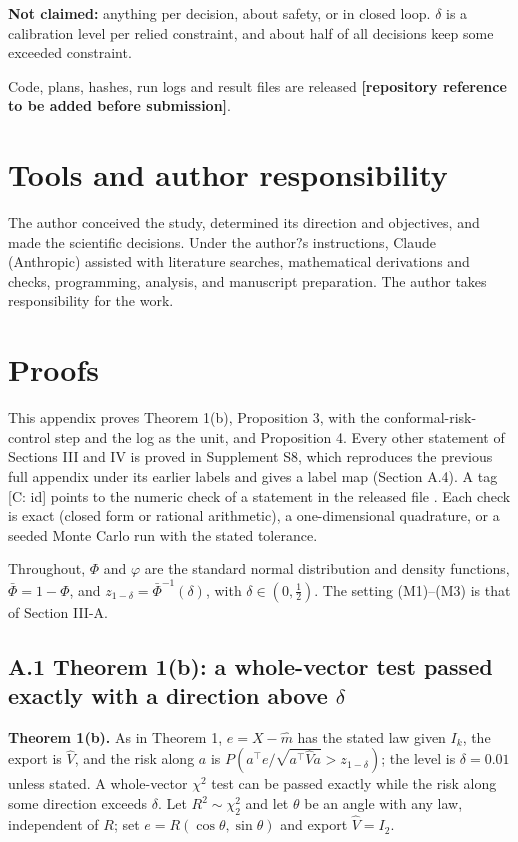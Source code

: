 \documentclass{ieeeaccess}
\begin{document}
\textbf{Not claimed:} anything per decision, about safety, or in closed loop. $\delta$ is a calibration level per relied constraint, and about half of all decisions keep some exceeded constraint.

Code, plans, hashes, run logs and result files are released \textbf{[repository reference to be added before submission]}.

\section*{Tools and author responsibility}
The author conceived the study, determined its direction and objectives, and made the scientific decisions. Under the author$\text{?}$s instructions, Claude (Anthropic) assisted with literature searches, mathematical derivations and checks, programming, analysis, and manuscript preparation. The author takes responsibility for the work.

\appendices
\section{\break Proofs}
This appendix proves Theorem 1(b), Proposition 3, with the conformal-risk-control step and the log as the unit, and Proposition 4. Every other statement of Sections III and IV is proved in Supplement S8, which reproduces the previous full appendix under its earlier labels and gives a label map (Section A.4). A tag [C: id] points to the numeric check of a statement in the released file . Each check is exact (closed form or rational arithmetic), a one-dimensional quadrature, or a seeded Monte Carlo run with the stated tolerance.

Throughout, $\Phi$ and $\varphi$ are the standard normal distribution and density functions, $\bar{\Phi} = 1 - \Phi$, and $z_{1-\delta} = \bar{\Phi}^{-1}(\delta)$, with $\delta \in (0, \tfrac{1}{2})$. The setting (M1)--(M3) is that of Section III-A.

\subsection*{A.1 Theorem 1(b): a whole-vector test passed exactly with a direction above $\delta$}
\textbf{Theorem 1(b).} As in Theorem 1, $e = X - \hat{m}$ has the stated law given $I_{k}$, the export is $\hat{V}$, and the risk along $a$ is $P(a^{\top}e/\sqrt{a^{\top}\hat{V}a} > z_{1-\delta})$; the level is $\delta = 0.01$ unless stated. A whole-vector $\chi^{2}$ test can be passed exactly while the risk along some direction exceeds $\delta$. Let $R^{2} \sim \chi_{2}^{2}$ and let $\theta$ be an angle with any law, independent of $R$; set $e = R(\cos \theta, \sin \theta)$ and export $\hat{V} = I_{2}$.
\end{document}
